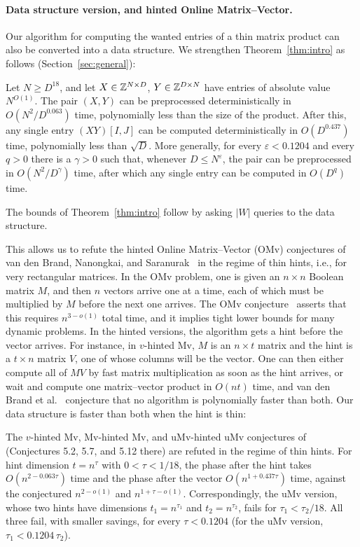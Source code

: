 \paragraph{Data structure version, and hinted Online Matrix--Vector.}
Our algorithm for computing the wanted entries of a thin matrix product can also be converted into a data structure. We strengthen Theorem~\ref{thm:intro} as follows (Section~\ref{sec:general}):

\begin{theorem}\label{thm:intro3}
Let $N\ge D^{18}$, and let $X\in\mathbb{Z}^{N\times D}$, $Y\in\mathbb{Z}^{D\times N}$ have entries of absolute value $N^{O(1)}$. The pair $(X,Y)$ can be preprocessed deterministically in $O(N^2/D^{0.063})$ time, polynomially less than the size of the product. After this, any single entry $(XY)[I,J]$ can be computed deterministically in $O(D^{0.437})$ time, polynomially less than $\sqrt D$. More generally, for every $\varepsilon<0.1204$ and every $q>0$ there is a $\gamma>0$ such that, whenever $D\le N^{\varepsilon}$, the pair can be preprocessed in $O(N^2/D^{\gamma})$ time, after which any single entry can be computed in $O(D^{q})$ time.
\end{theorem}

The bounds of Theorem~\ref{thm:intro} follow by asking $|W|$ queries to the data structure.

This allows us to refute the hinted Online Matrix--Vector (OMv) conjectures of van den Brand, Nanongkai, and Saranurak~\cite{BNS19} in the regime of thin hints, i.e., for very rectangular matrices. In the OMv problem, one is given an $n\times n$ Boolean matrix $M$, and then $n$ vectors arrive one at a time, each of which must be multiplied by $M$ before the next one arrives. The OMv conjecture~\cite{HKNS15} asserts that this requires $n^{3-o(1)}$ total time, and it implies tight lower bounds for many dynamic problems. In the hinted versions, the algorithm gets a hint before the vector arrives. For instance, in $v$-hinted Mv, $M$ is an $n\times t$ matrix and the hint is a $t\times n$ matrix $V$, one of whose columns will be the vector. One can then either compute all of $MV$ by fast matrix multiplication as soon as the hint arrives, or wait and compute one matrix--vector product in $O(nt)$ time, and van den Brand et al.~\cite{BNS19} conjecture that no algorithm is polynomially faster than both. Our data structure is faster than both when the hint is thin:

\begin{theorem}\label{thm:intro4}
The $v$-hinted Mv, Mv-hinted Mv, and uMv-hinted uMv conjectures of~\cite{BNS19} (Conjectures 5.2, 5.7, and 5.12 there) are refuted in the regime of thin hints. For hint dimension $t=n^{\tau}$ with $0<\tau<1/18$, the phase after the hint takes $O(n^{2-0.063\tau})$ time and the phase after the vector $O(n^{1+0.437\tau})$ time, against the conjectured $n^{2-o(1)}$ and $n^{1+\tau-o(1)}$. Correspondingly, the uMv version, whose two hints have dimensions $t_1=n^{\tau_1}$ and $t_2=n^{\tau_2}$, fails for $\tau_1<\tau_2/18$. All three fail, with smaller savings, for every $\tau<0.1204$ (for the uMv version, $\tau_1<0.1204\,\tau_2$).
\end{theorem}


